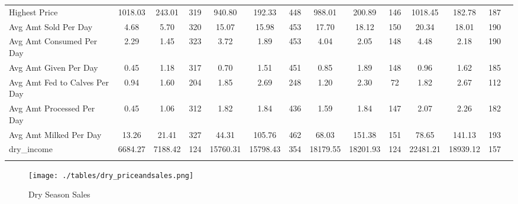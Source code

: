 \documentclass[11pt,letter,draft]{article}
\newcommand{\mcl}{\multicolumn}
\begin{document}
\begin{table}[ht]
{\begin{tabular}{l*{1}{ccccccccccccc}}
Highest Price     &     1018.03&      243.01&         319&      940.80&      192.33&         448&      988.01&      200.89&         146&     1018.45&      182.78&         187\\
Avg Amt Sold Per Day        &        4.68&        5.70&         320&       15.07&       15.98&         453&       17.70&       18.12&         150&       20.34&       18.01&         190\\
Avg Amt Consumed Per Day            &        2.29&        1.45&         323&        3.72&        1.89&         453&        4.04&        2.05&         148&        4.48&        2.18&         190\\
Avg Amt Given Per Day              &        0.45&        1.18&         317&        0.70&        1.51&         451&        0.85&        1.89&         148&        0.96&        1.62&         185\\
Avg Amt Fed to Calves Per Day             &        0.94&        1.60&         204&        1.85&        2.69&         248&        1.20&        2.30&          72&        1.82&        2.67&         112\\
Avg Amt Processed Per Day           &        0.45&        1.06&         312&        1.82&        1.84&         436&        1.59&        1.84&         147&        2.07&        2.26&         182\\

Avg Amt Milked Per Day    &       13.26&       21.41&         327&       44.31&      105.76&         462&       68.03&      151.38&         151&       78.65&      141.13&         193\\
dry\_income          &     6684.27&     7188.42&         124&    15760.31&    15798.43&         354&    18179.55&    18201.93&         124&    22481.21&    18939.12&         157\\


\hline\hline
\mcl{13}{l}{
\footnotesize{
\parbox{20cm}{\vspace{2mm}\baselineskip=11pt}}}%
\end{tabular}
}
\end{table}


\begin{figure}[!th]
\centering
\caption{Dry Season Sales}
\label{fig:dry_priceandsales}
\texttt{[image: ./tables/dry\_priceandsales.png]}
\footnotesize{
\parbox{10cm}{\vspace{2mm}  \baselineskip=11pt}}%
\end{figure}
\end{document}
